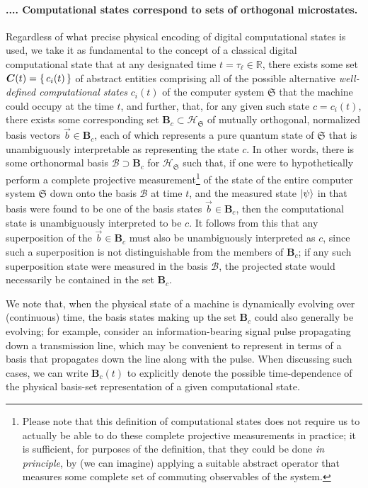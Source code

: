 \documentclass[preprints,article,accept,moreauthors,pdftex]{Definitions/mdpi}
\newcommand{\mypara}[1]{\paragraph{\arabic{section}.\arabic{subsection}.\arabic{subsubsection}.\arabic{paragraph}. #1}}
\begin{document}
\mypara{Computational states correspond to sets of orthogonal microstates.}\label{par:basis-sets}
Regardless of what precise physical encoding of digital computational states is used, we take it as fundamental to the concept of a classical digital computational state that at any designated time $t=\tau_\ell \in \mathbb{R}$, there exists some set $\boldsymbol{C}(t)=\set{c_i(t)}$ of abstract entities comprising all of the possible alternative {\em well-defined computational states} $c_i(t)$ of the computer system $\mathfrak{S}$ that the machine could occupy at the time $t$, and further, that, for any given such state $c = c_i(t)$, there exists some corresponding set $\boldsymbol{B}_c \subset \mathcal{H}_\mathfrak{S}$ of mutually orthogonal, normalized basis vectors $\vec{b}\in \boldsymbol{B}_c$, each of which represents a pure quantum state of $\mathfrak{S}$ that is unambiguously interpretable as representing the state $c$. In other words, there is some orthonormal basis $\boldsymbol{\mathcal{B}} \supset \boldsymbol{B}_c$ for $\mathcal{H}_\mathfrak{S}$ such that, if one were to hypothetically perform a complete projective measurement\footnote{Please note that this definition of computational states does not require us to actually be able to do these complete projective measurements in practice; it is sufficient, for purposes of the definition, that they could be done {\em in principle}, by (we can imagine) applying a suitable abstract operator that measures some complete set of commuting observables of the system.} of the state of the entire computer system $\mathfrak{S}$ down onto the basis $\boldsymbol{\mathcal{B}}$ at time $t$, and the measured state $\ket{\psi}$ in that basis were found to be one of the basis states $\vec{b}\in \boldsymbol{B}_c$, then the computational state is unambiguously interpreted to be $c$. It follows from this that any superposition of the $\vec{b}\in \boldsymbol{B}_c$ must also be unambiguously interpreted as $c$, since such a superposition is not distinguishable from the members of $\boldsymbol{B}_c$; if any such superposition state were measured in the basis $\boldsymbol{\mathcal{B}}$, the projected state would necessarily be contained in the set $\boldsymbol{B}_c$.

We note that, when the physical state of a machine is dynamically evolving over (continuous) time, the basis states making up the set $\boldsymbol{B}_c$ could also generally be evolving; for example, consider an information-bearing signal pulse propagating down a transmission line, which may be convenient to represent in terms of a basis that propagates down the line along with the pulse. When discussing such cases, we can write $\boldsymbol{B}_c(t)$ to explicitly denote the possible time-dependence of the physical basis-set representation of a given computational state.
\end{document}
